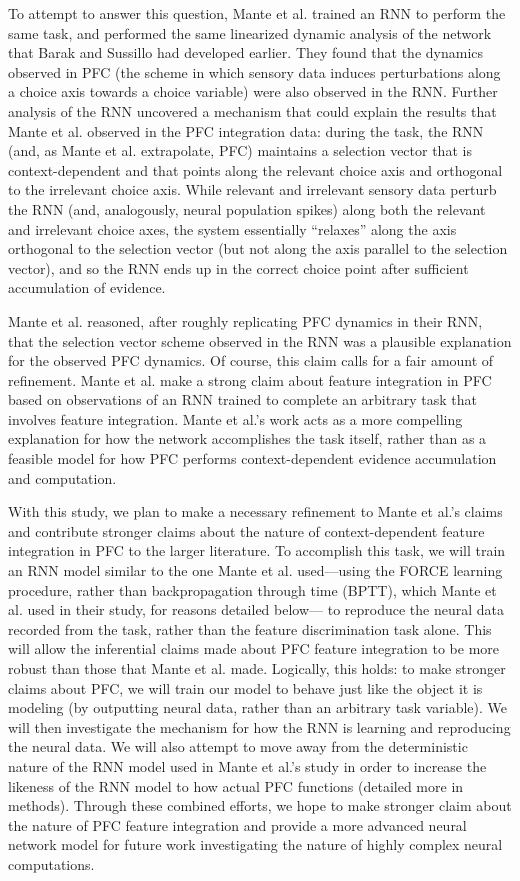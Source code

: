 \documentclass[12pt,a4paper,final]{iopart}
\begin{document}
To attempt to answer this question, Mante et al. trained an RNN to perform the same task, and performed the same linearized dynamic analysis of the network that Barak and Sussillo had developed earlier. They found that the dynamics observed in PFC (the scheme in which sensory data induces perturbations along a choice axis towards a choice variable) were also observed in the RNN. Further analysis of the RNN uncovered a mechanism that could explain the results that Mante et al. observed in the PFC integration data: during the task, the RNN (and, as Mante et al. extrapolate, PFC) maintains a selection vector that is context-dependent and that points along the relevant choice axis and orthogonal to the irrelevant choice axis. While relevant and irrelevant sensory data perturb the RNN (and, analogously, neural population spikes) along both the relevant and irrelevant choice axes, the system essentially “relaxes” along the axis orthogonal to the selection vector (but not along the axis parallel to the selection vector), and so the RNN ends up in the correct choice point after sufficient accumulation of evidence.

Mante et al. reasoned, after roughly replicating PFC dynamics in their RNN, that the selection vector scheme observed in the RNN was a plausible explanation for the observed PFC dynamics. Of course, this claim calls for a fair amount of refinement. Mante et al. make a strong claim about feature integration in PFC based on observations of an RNN trained to complete an arbitrary task that involves feature integration. Mante et al.’s work acts as a more compelling explanation for how the network accomplishes the task itself, rather than as a feasible model for how PFC performs context-dependent evidence accumulation and computation.

With this study, we plan to make a necessary refinement to Mante et al.’s claims and contribute stronger claims about the nature of context-dependent feature integration in PFC to the larger literature. To accomplish this task, we will train an RNN model similar to the one Mante et al. used—using the FORCE learning procedure, rather than backpropagation through time (BPTT), which Mante et al. used in their study, for reasons detailed below— to reproduce the neural data recorded from the task, rather than the feature discrimination task alone. This will allow the inferential claims made about PFC feature integration to be more robust than those that Mante et al. made. Logically, this holds: to make stronger claims about PFC, we will train our model to behave just like the object it is modeling (by outputting neural data, rather than an arbitrary task variable). We will then investigate the mechanism for how the RNN is learning and reproducing the neural data. We will also attempt to move away from the deterministic nature of the RNN model used in Mante et al.’s study in order to increase the likeness of the RNN model to how actual PFC functions (detailed more in methods). Through these combined efforts, we hope to make stronger claim about the nature of PFC feature integration and provide a more advanced neural network model for future work investigating the nature of highly complex neural computations.
\end{document}
